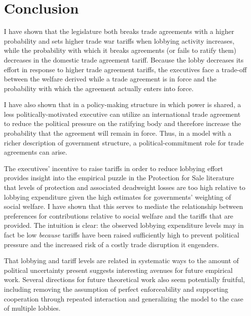 \documentclass[10pt]{article}
\begin{document}
\section{Conclusion}
\label{sec:concl}
I have shown that the legislature both breaks trade agreements with a higher probability and sets higher trade war tariffs when lobbying activity increases, while the probability with which it breaks agreements (or fails to ratify them) decreases in the domestic trade agreement tariff. Because the lobby decreases its effort in response to higher trade agreement tariffs, the executives face a trade-off between the welfare derived while a trade agreement is in force and the probability with which the agreement actually enters into force.

I have also shown that in a policy-making structure in which power is shared, a less politically-motivated executive can utilize an international trade agreement to reduce the political pressure on the ratifying body and therefore increase the probability that the agreement will remain in force. Thus, in a model with a richer description of government structure, a political-commitment role for trade agreements can arise.

The executives' incentive to raise tariffs in order to reduce lobbying effort provides insight into the empirical puzzle in the Protection for Sale literature that levels of protection and associated deadweight losses are too high relative to lobbying expenditure given the high estimates for governments' weighting of social welfare. I have shown that this serves to mediate the relationship between preferences for contributions relative to social welfare and the tariffs that are provided. The intuition is clear: the observed lobbying expenditure levels may in fact be low \textit{because} tariffs have been raised sufficiently high to prevent political pressure and the increased risk of a costly trade disruption it engenders.

That lobbying and tariff levels are related in systematic ways to the amount of political uncertainty present suggests interesting avenues for future empirical work. Several directions for future theoretical work also seem potentially fruitful, including removing the assumption of perfect enforceability and supporting cooperation through repeated interaction and generalizing the model to the case of multiple lobbies.

			
\end{document}
